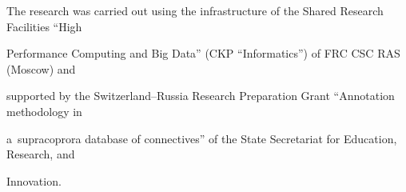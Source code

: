 




\vspace*{-14pt}








\Ack





\vspace*{-4pt}





\noindent


The research was carried out using the infrastructure of the Shared Research Facilities ``High 


Performance Computing and Big Data'' (CKP ``Informatics'') of FRC CSC RAS (Moscow) and 


supported by the Switzerland--Russia Research Preparation Grant ``Annotation methodology in 


a~supracoprora database of connectives'' of the State Secretariat for Education, Research, and 


Innovation.








\vspace*{-6pt}





\renewcommand{\bibname}{\protect\rmfamily References}







